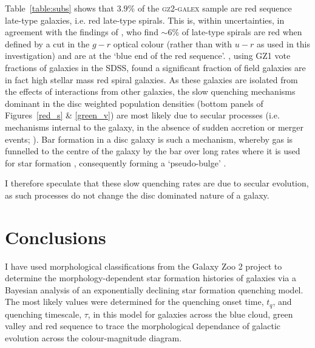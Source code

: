 Table~\ref{table:subs} shows that $3.9\%$ of the \textsc{gz2-galex} sample are red sequence late-type galaxies, i.e. red late-type spirals. This is, within uncertainties, in agreement with the findings of \citet{masters10c}, who find $\sim6\%$ of late-type spirals are red when defined by a cut in the $g-r$ optical colour (rather than with $u-r$ as used in this investigation) and are at the `blue end of the red sequence'. \citet{Bamford09}, using GZ1 vote fractions of galaxies in the SDSS, found a significant fraction of field galaxies are in fact high stellar mass red spiral galaxies. As these galaxies are isolated from the effects of interactions from other galaxies, the slow quenching mechanisms dominant in the disc weighted population densities (bottom panels of Figures~\ref{red_s} \& \ref{green_v}) are most likely due to secular processes (i.e. mechanisms internal to the galaxy, in the absence of sudden accretion or merger events; \citealt{kormendy04, Sheth12}). Bar formation in a disc galaxy is such a mechanism, whereby gas is funnelled to the centre of the galaxy by the bar over long rates where it is used for star formation \citep{masters12a, saintonge12, Cheung13}, consequently forming a `pseudo-bulge' \citep{Kormendy10, Simmons13}.

I therefore speculate that these slow quenching rates are due to secular evolution, as such processes do not change the disc dominated nature of a galaxy. 

\section{Conclusions}\label{morph:conc}

I have used morphological classifications from the Galaxy Zoo 2 project to determine the morphology-dependent star formation histories of galaxies via a Bayesian analysis of an exponentially declining star formation quenching model. The most likely values were determined for the quenching onset time, $t_q$, and quenching timescale, $\tau$, in this model for galaxies across the blue cloud, green valley and red sequence to trace the morphological dependance of galactic evolution across the colour-magnitude diagram. 


